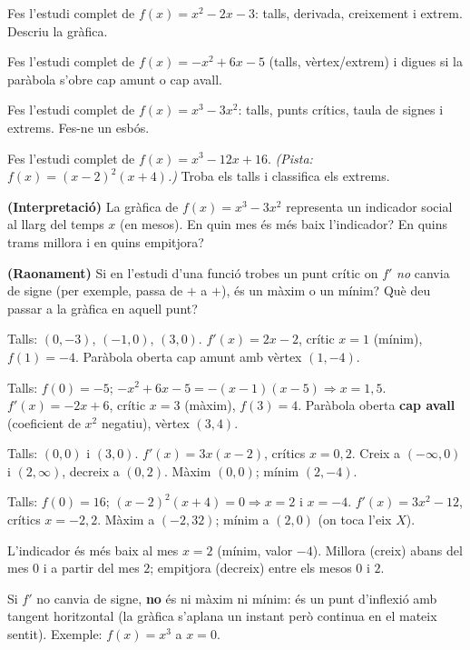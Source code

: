 \begin{exercicis}
\begin{exlist}
  \item Fes l'estudi complet de $f(x)=x^2-2x-3$: talls, derivada, creixement i extrem.
        Descriu la gràfica.
  \item Fes l'estudi complet de $f(x)=-x^2+6x-5$ (talls, vèrtex/extrem) i digues si la
        paràbola s'obre cap amunt o cap avall.
  \item Fes l'estudi complet de $f(x)=x^3-3x^2$: talls, punts crítics, taula de signes i
        extrems. Fes-ne un esbós.
  \item Fes l'estudi complet de $f(x)=x^3-12x+16$. \emph{(Pista: $f(x)=(x-2)^2(x+4)$.)}
        Troba els talls i classifica els extrems.
  \item \textbf{(Interpretació)} La gràfica de $f(x)=x^3-3x^2$ representa un indicador
        social al llarg del temps $x$ (en mesos). En quin mes és més baix l'indicador?
        En quins trams millora i en quins empitjora?
  \item \textbf{(Raonament)} Si en l'estudi d'una funció trobes un punt crític on $f'$
        \emph{no} canvia de signe (per exemple, passa de $+$ a $+$), és un màxim o un
        mínim? Què deu passar a la gràfica en aquell punt?
\end{exlist}
\end{exercicis}

\begin{solucions}
\begin{sollist}
  \item Talls: $(0,-3)$, $(-1,0)$, $(3,0)$. $f'(x)=2x-2$, crític $x=1$ (mínim),
        $f(1)=-4$. Paràbola oberta cap amunt amb vèrtex $(1,-4)$.
  \item Talls: $f(0)=-5$; $-x^2+6x-5=-(x-1)(x-5)\Rightarrow x=1,5$. $f'(x)=-2x+6$,
        crític $x=3$ (màxim), $f(3)=4$. Paràbola oberta \textbf{cap avall} (coeficient de
        $x^2$ negatiu), vèrtex $(3,4)$.
  \item Talls: $(0,0)$ i $(3,0)$. $f'(x)=3x(x-2)$, crítics $x=0,2$. Creix a $(-\infty,0)$
        i $(2,\infty)$, decreix a $(0,2)$. Màxim $(0,0)$; mínim $(2,-4)$.
  \item Talls: $f(0)=16$; $(x-2)^2(x+4)=0\Rightarrow x=2$ i $x=-4$. $f'(x)=3x^2-12$,
        crítics $x=-2,2$. Màxim a $(-2,32)$; mínim a $(2,0)$ (on toca l'eix $X$).
  \item L'indicador és més baix al mes $x=2$ (mínim, valor $-4$). Millora (creix) abans
        del mes $0$ i a partir del mes $2$; empitjora (decreix) entre els mesos $0$ i
        $2$.
  \item Si $f'$ no canvia de signe, \textbf{no} és ni màxim ni mínim: és un punt
        d'inflexió amb tangent horitzontal (la gràfica s'aplana un instant però continua
        en el mateix sentit). Exemple: $f(x)=x^3$ a $x=0$.
\end{sollist}
\end{solucions}
